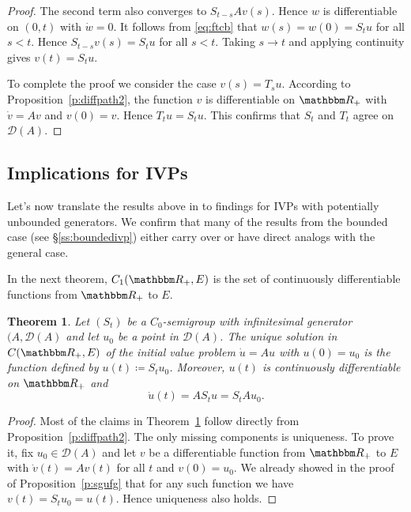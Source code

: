 \documentclass[12pt, reqno]{amsart}
\newcommand{\1}{\mathbbm 1}
\newcommand{\dD}{\mathcal D}
\newcommand{\RR}{\mathbbm R}
\theoremstyle{plain}
\newtheorem{theorem}{Theorem}[section]
\theoremstyle{definition}
\begin{document}
\begin{proof}
    The second term also converges to
    $S_{t-s} A v(s)$. Hence $w$ is differentiable on $(0, t)$ with $\dot w = 0$.
    It follows from \eqref{eq:ftcb} that $w(s) = w(0) = S_t u$ for all $s < t$.
    Hence $S_{t-s} v(s) = S_t u$ for all $s < t$.  Taking $s \to t$ and applying
    continuity gives $v(t) = S_t u$.  

    To complete the proof we consider the case $v(s) = T_s u$.  According to
    Proposition~\ref{p:diffpath2}, the function $v$ is differentiable on $\RR_+$
    with $\dot v = A v$ and $v(0) = v$. Hence $T_t u = S_t u$.
    This confirms that $S_t$ and $T_t$ agree on $\dD(A)$.
\end{proof}

\subsection{Implications for IVPs}

Let's now translate the results above in to findings for IVPs with potentially
unbounded generators.  We confirm that many of the results from the bounded
case (see \S\ref{ss:boundedivp}) either carry over or have direct analogs with
the general case.

In the next theorem, $C_1(\RR_+, E)$ is the set of continuously differentiable
functions from $\RR_+$ to $E$.

\begin{theorem}\label{t:ivps}
    Let $(S_t)$ be a $C_0$-semigroup with infinitesimal generator $(A, \dD(A)$
    and let $u_0$ be a point in $\dD(A)$.  The unique solution in $C(\RR_+, E)$
    of the initial value problem $\dot u = A u$ with $u(0) = u_0$ is the
    function defined by $u(t) \coloneq S_t u_0$. Moreover, $u(t)$ is continuously
    differentiable on $\RR_+$ and 
    \begin{equation*}
       \dot u(t) = A S_t u = S_t A u_0.
    \end{equation*}
\end{theorem}

\begin{proof}
    Most of the claims in Theorem~\ref{t:ivps} follow directly from
    Proposition~\ref{p:diffpath2}.  The only missing components is uniqueness.
    To prove it, fix $u_0 \in \dD(A)$ and let $v$ be a differentiable function from
    $\RR_+$ to $E$ with $\dot v(t) = A v (t)$ for all $t$ and $v(0) = u_0$.
    We already showed in the proof of Proposition~\ref{p:sgufg} that for any
    such function we have $v(t) = S_t u_0 = u(t)$.  Hence uniqueness also holds.
\end{proof}





\end{document}
